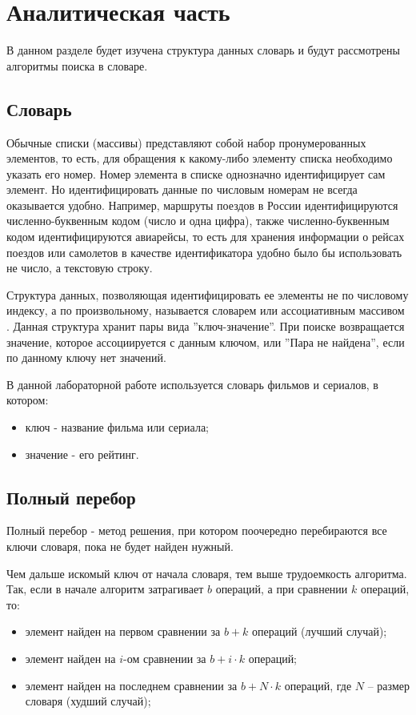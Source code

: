\chapter{Аналитическая часть}

В данном разделе будет изучена структура данных словарь и будут рассмотрены алгоритмы поиска в словаре.

\section{Словарь}

Обычные списки (массивы) представляют собой набор пронумерованных элементов, то есть, для обращения к какому-либо элементу списка необходимо указать его номер. Номер элемента в списке однозначно идентифицирует сам элемент. Но идентифицировать данные по числовым номерам не всегда оказывается удобно. Например, маршруты поездов в России идентифицируются численно-буквенным кодом (число и одна цифра), также численно-буквенным кодом идентифицируются авиарейсы, то есть для хранения информации о рейсах поездов или самолетов в качестве идентификатора удобно было бы использовать не число, а текстовую строку.

Структура данных, позволяющая идентифицировать ее элементы не по числовому индексу, а по произвольному, называется словарем или ассоциативным массивом \cite{dict}. Данная структура хранит пары вида ''ключ-значение''. При поиске возвращается значение, которое ассоциируется с данным ключом, или ''Пара не найдена'', если по данному ключу нет значений.

В данной лабораторной работе используется словарь фильмов и сериалов, в котором:
\begin{itemize}
	\item ключ - название фильма или сериала;
	\item значение - его рейтинг.
\end{itemize}

\section{Полный перебор}

Полный перебор \cite{search-full} - метод решения, при котором поочередно перебираются все ключи словаря, пока не будет найден нужный.

Чем дальше искомый ключ от начала словаря, тем выше трудоемкость алгоритма. Так, если в начале алгоритм затрагивает $b$ операций, а при сравнении $k$ операций, то:
\begin{itemize}
	\item элемент найден на первом сравнении за $b + k$ операций (лучший случай);
	\item элемент найден на $i$-ом сравнении за $b + i \cdot k$ операций;
	\item элемент найден на последнем сравнении за $b +  N \cdot k$ операций, где $N$ -- размер словаря (худший случай);
\end{itemize}

